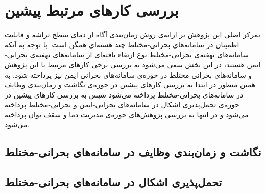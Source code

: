 \section{بررسی کارهای مرتبط پیشین}
\label{sec:survey}
تمرکز اصلی این پژوهش بر ارائه‌ی روش زمان‌بندی آگاه از دمای سطح تراشه و قابلیت اطمینان در سامانه‌های بحرانی-مختلط چند هسته‌ای همگن است. با توجه به آنکه سامانه‌های نهفته‌ی بحرانی-مختلط نوع ارتقاء یافته‌ای از سامانه‌های نهفته‌ی بحرانی-ایمن هستند\cite{Baruah2012b}، در این بخش سعی می‌شود به بررسی برخی کارهای مرتبط با این پژوهش و سامانه‌های بحرانی-مختلط در حوزه‌ی سامانه‌های بحرانی-ایمن نیز پرداخته شود. به همین منظور در ابتدا به بررسی کارهای پیشین در حوزه‌ی نگاشت و زمان‌بندی وظایف در سامانه‌های بحرانی-مختلط پرداخته می‌شود سپس به بررسی کار‌های پیشین در حوزه‌ی تحمل‌پذیری اشکال در سامانه‌های بحرانی-ایمن و بحرانی-مختلط پرداخته می‌شود و در انتها به بررسی پژوهش‌های حوزه‌ی مدیریت دما و سقف توان پرداخته می‌شود.

\subsection{نگاشت و زمان‌بندی وظایف در سامانه‌های بحرانی-مختلط}

\subsection{تحمل‌پذیری اشکال در سامانه‌های بحرانی-مختلط}

